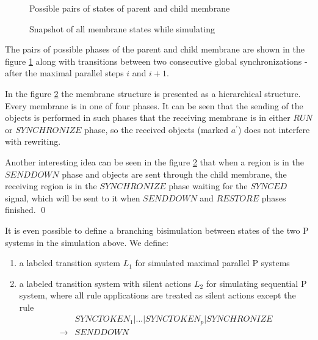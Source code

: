 \begin{dokaz}
  \begin{figure}
    \def\svgwidth{\textwidth}
    
    \caption{Possible pairs of states of parent and child membrane}
    \label{fig:possible_pairs_of_states_of_parent_and_child_membrane}
  \end{figure}

  \begin{figure}
    \def\svgwidth{\textwidth}
    
    \caption{Snapshot of all membrane states while simulating}
    \label{fig:snapshot_of_all_membrane_states_while_simulating}
  \end{figure}

  The pairs of possible phases of the parent and child membrane are shown in the figure \ref{fig:possible_pairs_of_states_of_parent_and_child_membrane} along with transitions between two consecutive global synchronizations - after the maximal parallel steps $i$ and $i+1$.

  In the figure \ref{fig:snapshot_of_all_membrane_states_while_simulating} the membrane structure is presented as a hierarchical structure. Every membrane is in one of four phases. It can be seen that the sending of the objects is performed in such phases that the receiving membrane is in either $\mathit{RUN}$ or $\mathit{SYNCHRONIZE}$ phase, so the received objects (marked $a^\prime$) does not interfere with rewriting.

  Another interesting idea can be seen in the figure \ref{fig:snapshot_of_all_membrane_states_while_simulating} that when a region is in the $\mathit{SENDDOWN}$ phase and objects are sent through the child membrane, the receiving region is in the $\mathit{SYNCHRONIZE}$ phase waiting for the $\mathit{SYNCED}$ signal, which will be sent to it when $\mathit{SENDDOWN}$ and $\mathit{RESTORE}$ phases finished. \qed

\end{dokaz}

It is even possible to define a branching bisimulation between states of the two P systems in the simulation above. We define:
\begin{enumerate}
  \item a labeled transition system $L_1$ for simulated maximal parallel P systems
  \item a labeled transition system with silent actions $L_2$ for simulating sequential P system, where all rule applications are treated as silent actions except the rule
    \begin{align*}
      &\mathit{SYNCTOKEN_1}|\dots|\mathit{SYNCTOKEN_p}|\mathit{SYNCHRONIZE} \\
      \rightarrow &\mathit{SENDDOWN}
    \end{align*}
\end{enumerate}

